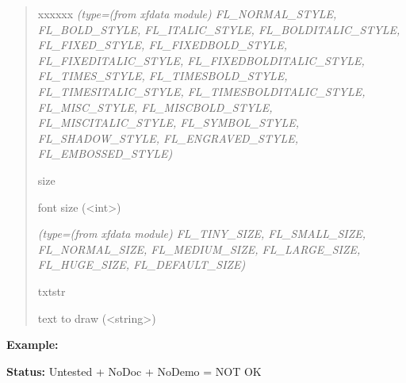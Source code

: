 \begin{boxedminipage}{\funcwidth}
\begin{quote}
\begin{Ventry}{xxxxxx}
            {\it (type=(from xfdata module) FL\_NORMAL\_STYLE, FL\_BOLD\_STYLE, FL\_ITALIC\_STYLE,
FL\_BOLDITALIC\_STYLE, FL\_FIXED\_STYLE, FL\_FIXEDBOLD\_STYLE, 
FL\_FIXEDITALIC\_STYLE, FL\_FIXEDBOLDITALIC\_STYLE, FL\_TIMES\_STYLE, 
FL\_TIMESBOLD\_STYLE, FL\_TIMESITALIC\_STYLE, FL\_TIMESBOLDITALIC\_STYLE, 
FL\_MISC\_STYLE, FL\_MISCBOLD\_STYLE, FL\_MISCITALIC\_STYLE, 
FL\_SYMBOL\_STYLE, FL\_SHADOW\_STYLE, FL\_ENGRAVED\_STYLE, 
FL\_EMBOSSED\_STYLE)}

          \item[size]

          font size ({\textless}int{\textgreater})

            {\it (type=(from xfdata module) FL\_TINY\_SIZE, FL\_SMALL\_SIZE, FL\_NORMAL\_SIZE, 
FL\_MEDIUM\_SIZE, FL\_LARGE\_SIZE, FL\_HUGE\_SIZE, FL\_DEFAULT\_SIZE)}

          \item[txtstr]

          text to draw ({\textless}string{\textgreater})

        \end{Ventry}

      \end{quote}

\textbf{Example:} 

\textbf{Status:} Untested + NoDoc + NoDemo = NOT OK



    \end{boxedminipage}

    \label{xformslib:library:fl_drw_text_beside}

    \vspace{0.5ex}

